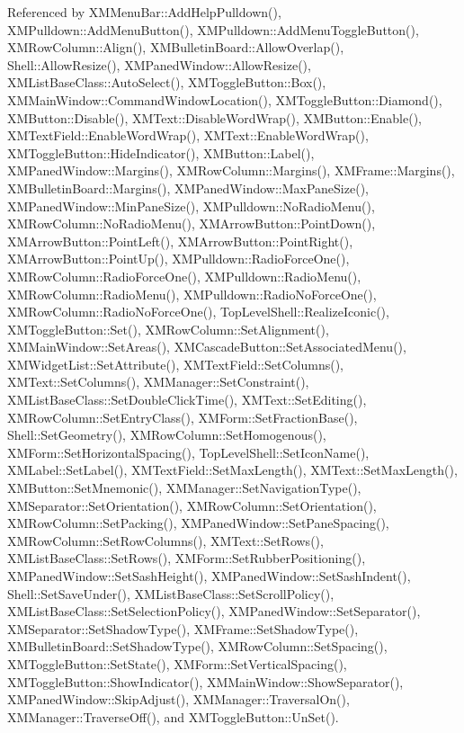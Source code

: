 Referenced by XMMenu\-Bar::Add\-Help\-Pulldown(), XMPulldown::Add\-Menu\-Button(), XMPulldown::Add\-Menu\-Toggle\-Button(), XMRow\-Column::Align(), XMBulletin\-Board::Allow\-Overlap(), Shell::Allow\-Resize(), XMPaned\-Window::Allow\-Resize(), XMList\-Base\-Class::Auto\-Select(), XMToggle\-Button::Box(), XMMain\-Window::Command\-Window\-Location(), XMToggle\-Button::Diamond(), XMButton::Disable(), XMText::Disable\-Word\-Wrap(), XMButton::Enable(), XMText\-Field::Enable\-Word\-Wrap(), XMText::Enable\-Word\-Wrap(), XMToggle\-Button::Hide\-Indicator(), XMButton::Label(), XMPaned\-Window::Margins(), XMRow\-Column::Margins(), XMFrame::Margins(), XMBulletin\-Board::Margins(), XMPaned\-Window::Max\-Pane\-Size(), XMPaned\-Window::Min\-Pane\-Size(), XMPulldown::No\-Radio\-Menu(), XMRow\-Column::No\-Radio\-Menu(), XMArrow\-Button::Point\-Down(), XMArrow\-Button::Point\-Left(), XMArrow\-Button::Point\-Right(), XMArrow\-Button::Point\-Up(), XMPulldown::Radio\-Force\-One(), XMRow\-Column::Radio\-Force\-One(), XMPulldown::Radio\-Menu(), XMRow\-Column::Radio\-Menu(), XMPulldown::Radio\-No\-Force\-One(), XMRow\-Column::Radio\-No\-Force\-One(), Top\-Level\-Shell::Realize\-Iconic(), XMToggle\-Button::Set(), XMRow\-Column::Set\-Alignment(), XMMain\-Window::Set\-Areas(), XMCascade\-Button::Set\-Associated\-Menu(), XMWidget\-List::Set\-Attribute(), XMText\-Field::Set\-Columns(), XMText::Set\-Columns(), XMManager::Set\-Constraint(), XMList\-Base\-Class::Set\-Double\-Click\-Time(), XMText::Set\-Editing(), XMRow\-Column::Set\-Entry\-Class(), XMForm::Set\-Fraction\-Base(), Shell::Set\-Geometry(), XMRow\-Column::Set\-Homogenous(), XMForm::Set\-Horizontal\-Spacing(), Top\-Level\-Shell::Set\-Icon\-Name(), XMLabel::Set\-Label(), XMText\-Field::Set\-Max\-Length(), XMText::Set\-Max\-Length(), XMButton::Set\-Mnemonic(), XMManager::Set\-Navigation\-Type(), XMSeparator::Set\-Orientation(), XMRow\-Column::Set\-Orientation(), XMRow\-Column::Set\-Packing(), XMPaned\-Window::Set\-Pane\-Spacing(), XMRow\-Column::Set\-Row\-Columns(), XMText::Set\-Rows(), XMList\-Base\-Class::Set\-Rows(), XMForm::Set\-Rubber\-Positioning(), XMPaned\-Window::Set\-Sash\-Height(), XMPaned\-Window::Set\-Sash\-Indent(), Shell::Set\-Save\-Under(), XMList\-Base\-Class::Set\-Scroll\-Policy(), XMList\-Base\-Class::Set\-Selection\-Policy(), XMPaned\-Window::Set\-Separator(), XMSeparator::Set\-Shadow\-Type(), XMFrame::Set\-Shadow\-Type(), XMBulletin\-Board::Set\-Shadow\-Type(), XMRow\-Column::Set\-Spacing(), XMToggle\-Button::Set\-State(), XMForm::Set\-Vertical\-Spacing(), XMToggle\-Button::Show\-Indicator(), XMMain\-Window::Show\-Separator(), XMPaned\-Window::Skip\-Adjust(), XMManager::Traversal\-On(), XMManager::Traverse\-Off(), and XMToggle\-Button::Un\-Set().
